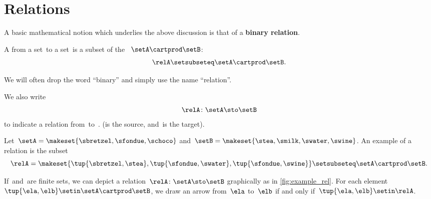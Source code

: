 
\section{Relations}
\label{sec:connection-relations}

A basic mathematical notion which underlies the above discussion is that of a \textbf{binary relation}.

\begin{ctdefinition}
    \label{def:binary-relation}
    A  \relA from a set~\setA to a set~\setB is a subset of the ~$\setA\cartprod \setB$:
    \begin{equation}
        \relA \setsubseteq \setA \cartprod \setB.
    \end{equation}
\end{ctdefinition}

We will often drop the word ``binary'' and simply use the name ``relation''.

We also write
\begin{equation}
    \relA \colon \setA \sto \setB
\end{equation}
to indicate a relation from~\setA to~\setB.
(\setA is the source, and~\setB is the target).

\begin{marginfigure}
    \centering
    \caption{}
    \label{fig:example_rel}
\end{marginfigure}

\begin{example}
    \label{exa:simple-rel}
    Let~$\setA = \makeset{ \sbretzel, \sfondue, \schoco}$ and~$\setB = \makeset{ \stea, \smilk, \swater, \swine }$.
    An example of a relation is the subset
    \begin{equation}
        \relA = \makeset{ \tup{\sbretzel, \stea}, \tup{\sfondue, \swater}, \tup{\sfondue, \swine} } \setsubseteq \setA \cartprod \setB.
    \end{equation}
\end{example}

If~\setA and~\setB are finite sets, we can depict a relation~$\relA \colon \setA \sto \setB$ graphically as in \cref{fig:example_rel}.
For each element~$\tup{\ela,\elb} \setin \setA \cartprod \setB$, we draw an arrow from~$\ela$ to~$\elb$ if and only if~$\tup{\ela,\elb} \setin \relA$.

